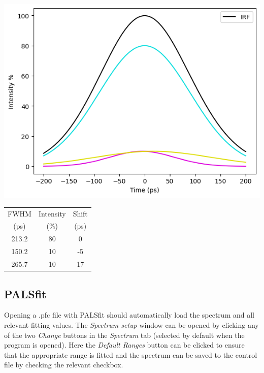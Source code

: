 \begin{minipage}{0.6\textwidth}
    \includegraphics[width=\textwidth]{Batch 3/regular IRF/irf.png}
\end{minipage}
\begin{minipage}{0.35\textwidth}
     
    \label{tab:irfcomp}
    \begin{tabular}{|c|c|c|}
        \hline
        FWHM& Intensity& Shift \\
        (ps) & (\%) & (ps)\\
        \hline
        213.2 & 80 &  0\\
        150.2 & 10 & -5\\
        265.7 & 10 & 17\\
        \hline
    \end{tabular}
    \vspace{1cm}
    \label{fig:irf}
\end{minipage}

\subsection{PALSfit}

Opening a .pfc file with PALSfit should automatically load the spectrum and all relevant fitting values. The \textit{Spectrum setup} window can be opened by clicking any of the two \textit{Change} buttons in the \textit{Spectrum} tab (selected by default when the program is opened). Here the \textit{Default Ranges} button can be clicked to ensure that the appropriate range is fitted and the spectrum can be saved to the control file by checking the relevant checkbox.

